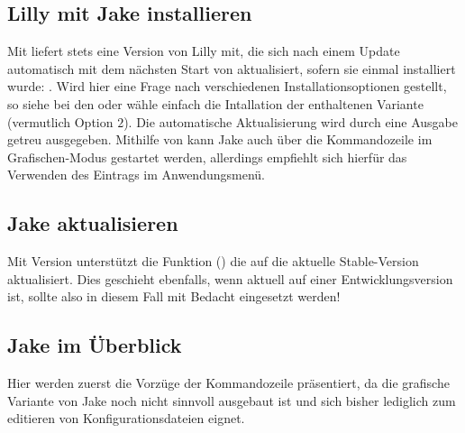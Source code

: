 \subsection{Lilly mit Jake installieren}
Mit  liefert \Jake stets eine Version von Lilly mit, die sich nach einem Update automatisch mit dem nächsten Start von \Jake aktualisiert, sofern sie einmal installiert wurde: . Wird hier eine Frage nach verschiedenen Installationsoptionen gestellt, so siehe bei den  oder wähle einfach die Intallation der enthaltenen Variante (vermutlich Option $2$). Die automatische Aktualisierung wird durch eine Ausgabe getreu  ausgegeben. Mithilfe von  kann Jake auch über die Kommandozeile im Grafischen-Modus gestartet werden, allerdings empfiehlt sich hierfür das Verwenden des Eintrags im Anwendungsmenü.

\subsection{Jake aktualisieren}

Mit Version  unterstützt \Jake die Funktion  () die \Jake auf die aktuelle Stable-Version aktualisiert. Dies geschieht ebenfalls, wenn \Jake aktuell auf einer Entwicklungsversion ist, sollte also in diesem Fall mit Bedacht eingesetzt werden!

\subsection{Jake im Überblick}
Hier werden zuerst die Vorzüge der Kommandozeile präsentiert, da die grafische Variante von Jake noch nicht sinnvoll ausgebaut ist und sich bisher lediglich zum editieren von Konfigurationsdateien eignet.
